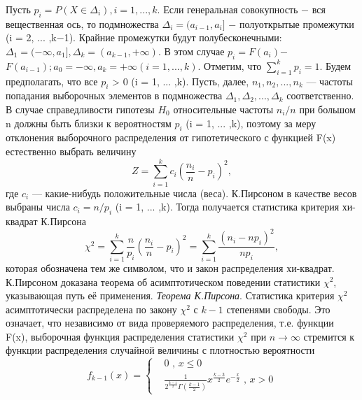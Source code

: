 Пусть $p_{i} = P(X \in \Delta_{i}), i = 1, ... ,k$. 
\newline
Если генеральная совокупность $-$ вся вещественная ось, то подмножества $\Delta_i = (a_{i-1},a_{i}]$ $-$ полуоткрытые промежутки (i = 2, ... ,k$-$1). Крайние промежутки будут полубесконечными: $\Delta_{1} = (-\infty,a_{1}], \Delta_{k} = (a_{k-1},+\infty).$ В этом случае $p_{i} = F(a_{i})$$-$$F(a_{i-1}); a_{0} = -\infty, a_{k} = +\infty (i = 1, ... ,k).$
\newline
Отметим, что $\sum_{i=1}^{k}{p_{i}} = 1$.
Будем предполагать, что все $p_{i}$ > 0 (i = 1, ... ,k).
\newline
Пусть, далее, $n_{1},n_{2}, ... ,n_{k}$ — частоты попадания выборочных элементов в подмножества $\Delta_{1},\Delta_{2}, ... ,\Delta_{k}$ соответственно.
\newline
В случае справедливости гипотезы $H_{0}$ относительные частоты $n_{i}/n$ при большом n должны быть близки к вероятностям $p_{i}$ (i = 1, ... ,k), поэтому за меру отклонения выборочного распределения от гипотетического с функцией F(x) естественно выбрать величину
\begin{equation}
Z = \sum_{i = 1}^{k}{c_{i}(\frac{n_{i}}{n} - p_{i})^{2}}, 
\label{Z}
\end{equation}
где $c_{i}$ — какие-нибудь положительные числа (веса). К.Пирсоном в качестве весов выбраны числа $c_{i} = n/p_{i}$ (i = 1, ... ,k). Тогда получается статистика критерия хи-квадрат К.Пирсона
\begin{equation}
\chi^{2} = \sum_{i = 1}^{k}{\frac{n}{p_{i}}(\frac{n_{i}}{n} - p_{i})^{2}} = \sum_{i = 1}^{k}{\frac{(n_{i} - np_{i})^{2}}{np_{i}}}, 
\label{chi_2}
\end{equation}
которая обозначена тем же символом, что и закон распределения хи-квадрат.
\newline
К.Пирсоном доказана теорема об асимптотическом поведении статистики $\chi^{2}$, указывающая путь её применения.
\newline
\textit{Теорема К.Пирсона}. Статистика критерия $\chi^{2}$ асимптотически распределена по закону $\chi^{2}$ с $k-1$ степенями свободы.
\newline
Это означает, что независимо от вида проверяемого распределения, т.е. функции F(x), выборочная функция распределения статистики $\chi^{2}$ при $n \rightarrow \infty$  стремится к функции распределения случайной величины с плотностью вероятности 
\begin{equation}
f_{k - 1}(x) = 
\begin{cases}
& 0 \text{ , } x  \leq 0  \\ 
& \frac{1}{2^{\frac{k-1}{2}}\Gamma(\frac{k-1}{2})}x^{\frac{k-3}{2}}e^{-\frac{x}{2}}
\text{ , } x>0 
\end{cases}
\label{f_k-1}
\end{equation}
